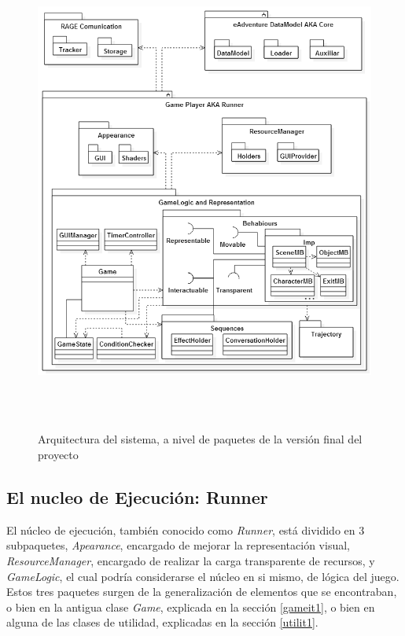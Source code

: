 \begin{figure}[h]
	\centerline{\includegraphics[height=6.3in]{figures/it2/Arquitectura.png}}
	\caption[Arquitectura - Versión Final]{Arquitectura del sistema, a nivel de paquetes de la versión final del proyecto}
	\label{arquitecturait2}
\end{figure}

\newpage

\subsection{El nucleo de Ejecución: Runner}

El núcleo de ejecución, también conocido como \textit{Runner}, está dividido en 3 subpaquetes, \textit{Apearance}, encargado de mejorar la representación visual, \textit{ResourceManager}, encargado de realizar la carga transparente de recursos, y \textit{GameLogic}, el cual podría considerarse el núcleo en si mismo, de lógica del juego. Estos tres paquetes surgen de la generalización de elementos que se encontraban, o bien en la antigua clase \textit{Game}, explicada en la sección \ref{gameit1}, o bien en alguna de las clases de utilidad, explicadas en la sección \ref{utilit1}.

